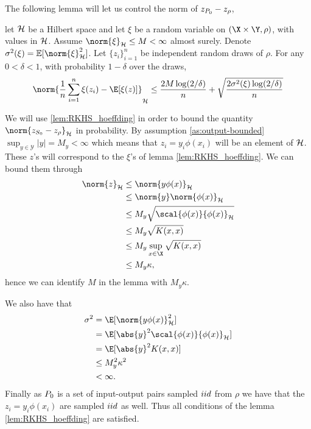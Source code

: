 The following lemma will let us control the norm of \(z_{P_{0}} - z_{\rho}\),
\begin{lemma}
  \label{lem:RKHS_hoeffding}
  let \(\mathcal{H}\) be a Hilbert space and let \(\xi\) be a random variable
  on \((\X \times \Y, \rho)\), with values in \(\mathcal{H}\). Assume
  \(\norm{\xi}_{\rkhs{H}} \leq M < \infty\) almost surely. Denote
  \(\sigma^2(\xi) = \mathbb{E}[\norm{\xi}_{\rkhs{H}}^2]\). Let
  \(\{z_i\}_{i=1}^n\) be independent random draws of \(\rho\). For any \(0 <
  \delta < 1\), with probability \(1 - \delta\) over the draws,
  \begin{equation}
    \label{eq:RKHS_hoeffding_bound}
    \norm{\frac{1}{n}\sum_{i=1}^n\xi(z_i) - \E[\xi(z)]}_{\rkhs{H}} \leq \frac{2 M \log(2/\delta)}{n} + \sqrt{\frac{2 \sigma^2(\xi) \log(2/\delta)}{n}}
  \end{equation}
\end{lemma}

We will use \ref{lem:RKHS_hoeffding} in  order to bound the quantity
\(\norm{z_{\trainset_0} - z_{\rho}}_{\rkhs{H}}\) in probability. 
By assumption \ref{as:output-bounded} \(\sup_{y \in \mathcal{Y}}|y| = M_y <
\infty\) which means that \(z_{i} = y_{i} \phi(x_{i})\) will be an element of
\(\mathcal{H}\). These \(z\)'s will correspond to the \(\xi\)'s of lemma \ref{lem:RKHS_hoeffding}. 
We can bound them through
\begin{align*}
  \norm{z}_{\rkhs{H}} & \leq \norm{y \phi(x)}_{\rkhs{H}} \\
                      & \leq \norm{y}\norm{\phi(x)}_{\rkhs{H}} \\
                      & \leq M_y\sqrt{\scal{\phi(x)}{\phi(x)}_{\rkhs{H}}} \\
                      & \leq M_y\sqrt{K(x, x)} \\
                      & \leq M_y \sup_{x \in \X} \sqrt{K(x, x)} \\
                      & \leq M_y \kappa,
\end{align*}
hence we can identify \(M\) in the lemma with \(M_{y}\kappa\).

We also have that
\begin{align*}
  \sigma^2 & = \E[\norm{y \phi(x)}_{\rkhs{H}}^2] \\
           & = \E[\abs{y}^2 \scal{\phi(x)}{\phi(x)}_{\rkhs{H}}] \\
           & = \E[\abs{y}^2 K(x, x)] \\
           & \leq M^2_y \kappa^2 \\
           & < \infty.
\end{align*}
Finally as \(P_{0}\) is a set of input-output pairs sampled \(iid\) from \(\rho\)
we have that the \(z_{i} = y_{i}\phi(x_{i})\) are sampled \(iid\) as well. Thus
all conditions of the lemma \ref{lem:RKHS_hoeffding} are satisfied.

